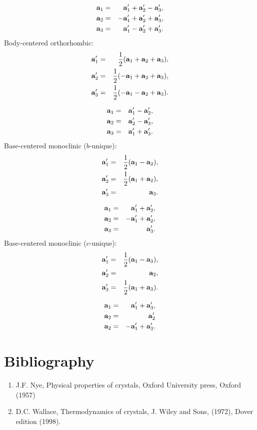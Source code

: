 \documentclass[12pt,a4paper]{article}
\begin{document}
\begin{eqnarray}
{\bf a}_1&=&  {\bf a}_1' + {\bf a}_2' - {\bf a}_3', \\
{\bf a}_2&=& -{\bf a}_1' + {\bf a}_2' + {\bf a}_3', \\
{\bf a}_3&=&  {\bf a}_1' - {\bf a}_2' + {\bf a}_3'.
\end{eqnarray}
Body-centered orthorhombic:
\begin{eqnarray}
{\bf a}_1'&=&{1\over 2} ({\bf a}_1 + {\bf a}_2 + {\bf a}_3), \\
{\bf a}_2'&=&{1\over 2} (-{\bf a}_1 + {\bf a}_2 + {\bf a}_3), \\
{\bf a}_3'&=&{1\over 2} (-{\bf a}_1 - {\bf a}_2 + {\bf a}_3). 
\end{eqnarray}

\begin{eqnarray}
{\bf a}_1&=&  {\bf a}_1' - {\bf a}_2', \\
{\bf a}_2&=&  {\bf a}_2' - {\bf a}_3', \\
{\bf a}_3&=& {\bf a}_1' + {\bf a}_3'.
\end{eqnarray}
Base-centered monoclinic ($b$-unique):
\begin{eqnarray}
{\bf a}_1'&=&{1\over 2} ({\bf a}_1 - {\bf a}_2), \\
{\bf a}_2'&=&{1\over 2} ({\bf a}_1 + {\bf a}_2), \\
{\bf a}_3'&=&{\bf a}_3. 
\end{eqnarray}

\begin{eqnarray}
{\bf a}_1&=&  {\bf a}_1' + {\bf a}_2', \\
{\bf a}_2&=& -{\bf a}_1' + {\bf a}_2', \\
{\bf a}_3&=& {\bf a}_3'.
\end{eqnarray}
Base-centered monoclinic ($c$-unique):
\begin{eqnarray}
{\bf a}_1'&=&{1\over 2} ({\bf a}_1 - {\bf a}_3), \\
{\bf a}_2'&=&{\bf a}_2, \\
{\bf a}_3'&=&{1\over 2} ({\bf a}_1 + {\bf a}_3). 
\end{eqnarray}

\begin{eqnarray}
{\bf a}_1&=& {\bf a}_1' + {\bf a}_3', \\
{\bf a}_2&=& {\bf a}_2' \\
{\bf a}_2&=& -{\bf a}_1' + {\bf a}_3'.
\end{eqnarray}


\newpage

\section{\color{coral}Bibliography}
\begin{enumerate}

\item
J.F. Nye, Physical properties of crystals, Oxford University press, 
Oxford (1957)

\item
D.C. Wallace, Thermodynamics of crystals, J. Wiley and Sons, (1972),
Dover edition (1998).

\end{enumerate}
\end{document}
